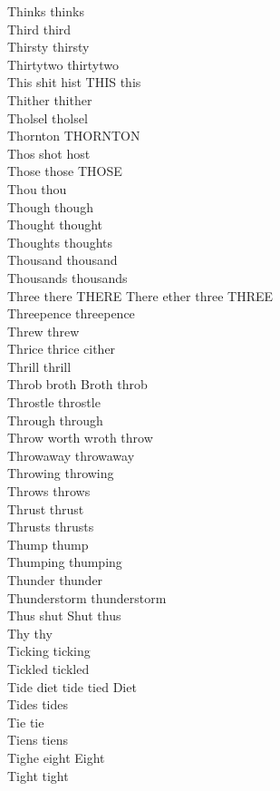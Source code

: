 Thinks thinks\\
Third third\\
Thirsty thirsty\\
Thirtytwo thirtytwo\\
This shit hist THIS this\\
Thither thither\\
Tholsel tholsel\\
Thornton THORNTON\\
Thos shot host\\
Those those THOSE\\
Thou thou\\
Though though\\
Thought thought\\
Thoughts thoughts\\
Thousand thousand\\
Thousands thousands\\
Three there THERE There ether three THREE\\
Threepence threepence\\
Threw threw\\
Thrice thrice cither\\
Thrill thrill\\
Throb broth Broth throb\\
Throstle throstle\\
Through through\\
Throw worth wroth throw\\
Throwaway throwaway\\
Throwing throwing\\
Throws throws\\
Thrust thrust\\
Thrusts thrusts\\
Thump thump\\
Thumping thumping\\
Thunder thunder\\
Thunderstorm thunderstorm\\
Thus shut Shut thus\\
Thy thy\\
Ticking ticking\\
Tickled tickled\\
Tide diet tide tied Diet\\
Tides tides\\
Tie tie\\
Tiens tiens\\
Tighe eight Eight\\
Tight tight\\
